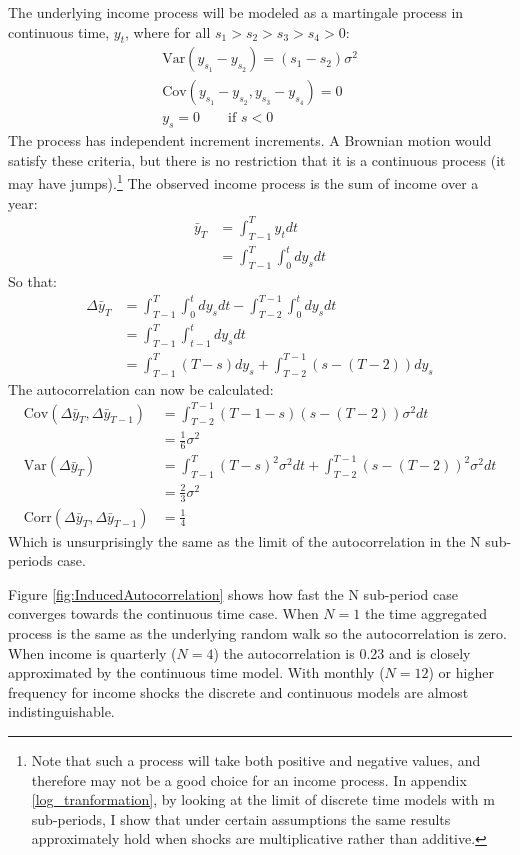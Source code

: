 \documentclass[AER]{AEA}
\begin{document}
The underlying income process will be modeled as a martingale process in continuous time, $y_t$, where for all  $s_1>s_2>s_3>s_4>0$:
\begin{align*}
\mathrm{Var}(y_{s_1}-y_{s_2})=(s_1-s_2)\sigma^2 \\
\mathrm{Cov}(y_{s_1}-y_{s_2},y_{s_3}-y_{s_4}) = 0 \\
y_s = 0 \qquad \text{if } s<0
\end{align*}
The process has independent increment increments. A Brownian motion would satisfy these criteria, but there is no restriction that it is a continuous process (it may have jumps).\footnote{Note that such a process will take both positive and negative values, and therefore may not be a good choice for an income process. In appendix \ref{log_tranformation}, by looking at the limit of discrete time models with m sub-periods, I show that under certain assumptions the same results approximately hold when shocks are multiplicative rather than additive.} The observed income process is the sum of income over a year:
\begin{align*}
\bar{y}_T &= \int_{T-1}^{T} y_t dt \\
&= \int_{T-1}^{T} \int_{0}^{t} dy_s dt 
\end{align*}
So that:
\begin{align*}
\Delta \bar{y}_T &= \int_{T-1}^{T} \int_{0}^{t} dy_s dt - \int_{T-2}^{T-1} \int_{0}^{t} dy_s dt \\
&= \int_{T-1}^{T} \int_{t-1}^{t} dy_s dt \\
&= \int_{T-1}^{T} (T-s) dy_s + \int_{T-2}^{T-1} (s-(T-2)) dy_s 
\end{align*}
The autocorrelation can now be calculated:
\begin{align*}
\mathrm{Cov}(\Delta \bar{y}_T,\Delta \bar{y}_{T-1}) &=  \int_{T-2}^{T-1} (T-1-s)(s-(T-2)) \sigma^2 dt \\
&= \frac{1}{6}\sigma^2 \\
\mathrm{Var}(\Delta \bar{y}_T) &= \int_{T-1}^{T} (T-s)^2 \sigma^2 dt + \int_{T-2}^{T-1} (s-(T-2))^2 \sigma^2 dt \\
&= \frac{2}{3}\sigma^2 \\
\mathrm{Corr}(\Delta \bar{y}_T,\Delta \bar{y}_{T-1}) &= \frac{1}{4}
\end{align*}
Which is unsurprisingly the same as the limit of the autocorrelation in the N sub-periods case.

Figure \ref{fig:InducedAutocorrelation} shows how fast the N sub-period case converges towards the continuous time case. When $N=1$ the time aggregated process is the same as the underlying random walk so the autocorrelation is zero. When income is quarterly ($N=4$) the autocorrelation is 0.23 and is closely approximated by the continuous time model. With monthly ($N=12$) or higher frequency for income shocks the discrete and continuous models are almost indistinguishable.
\end{document}

